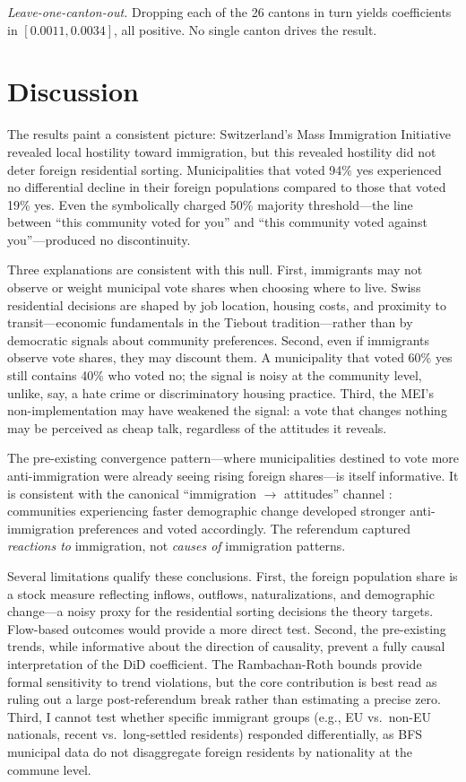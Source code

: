 \documentclass[12pt]{article}
\begin{document}
\textit{Leave-one-canton-out.} Dropping each of the 26 cantons in turn yields coefficients in $[0.0011, 0.0034]$, all positive. No single canton drives the result.



\section{Discussion}

The results paint a consistent picture: Switzerland's Mass Immigration Initiative revealed local hostility toward immigration, but this revealed hostility did not deter foreign residential sorting. Municipalities that voted 94\% yes experienced no differential decline in their foreign populations compared to those that voted 19\% yes. Even the symbolically charged 50\% majority threshold---the line between ``this community voted for you'' and ``this community voted against you''---produced no discontinuity.

Three explanations are consistent with this null. First, immigrants may not observe or weight municipal vote shares when choosing where to live. Swiss residential decisions are shaped by job location, housing costs, and proximity to transit---economic fundamentals in the Tiebout tradition---rather than by democratic signals about community preferences. Second, even if immigrants observe vote shares, they may discount them. A municipality that voted 60\% yes still contains 40\% who voted no; the signal is noisy at the community level, unlike, say, a hate crime or discriminatory housing practice. Third, the MEI's non-implementation may have weakened the signal: a vote that changes nothing may be perceived as cheap talk, regardless of the attitudes it reveals.

The pre-existing convergence pattern---where municipalities destined to vote more anti-immigration were already seeing rising foreign shares---is itself informative. It is consistent with the canonical ``immigration $\to$ attitudes'' channel \citep{dustmann2007, card2012}: communities experiencing faster demographic change developed stronger anti-immigration preferences and voted accordingly. The referendum captured \textit{reactions to} immigration, not \textit{causes of} immigration patterns.

Several limitations qualify these conclusions. First, the foreign population share is a stock measure reflecting inflows, outflows, naturalizations, and demographic change---a noisy proxy for the residential sorting decisions the theory targets. Flow-based outcomes would provide a more direct test. Second, the pre-existing trends, while informative about the direction of causality, prevent a fully causal interpretation of the DiD coefficient. The Rambachan-Roth bounds provide formal sensitivity to trend violations, but the core contribution is best read as ruling out a large post-referendum break rather than estimating a precise zero. Third, I cannot test whether specific immigrant groups (e.g., EU vs.\ non-EU nationals, recent vs.\ long-settled residents) responded differentially, as BFS municipal data do not disaggregate foreign residents by nationality at the commune level.
\end{document}
